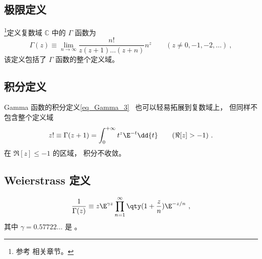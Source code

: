 

\subsection{极限定义}
\footnote{参考 \cite{Arfken} 相关章节。}定义复数域 $\mathbb C$ 中的 $\Gamma$ 函数为
\begin{equation}
\Gamma(z) \equiv \lim_{n\to\infty} \frac{n!}{z(z+1)\dots(z+n)}n^z \qquad (z \ne 0, -1, -2,\dots)~,
\end{equation}
该定义包括了 $\Gamma$ 函数的整个定义域。

\subsection{积分定义}
Gamma 函数的积分定义\autoref{eq_Gamma_3}~ 也可以轻易拓展到复数域上， 但同样不包含整个定义域
\begin{equation}
z! \equiv \Gamma (z + 1) = \int_0^{+\infty} t^z \E^{-t} \dd{t} \qquad (\Re[z] > -1)~.
\end{equation}
在 $\Re[z] \leqslant -1$ 的区域， 积分不收敛。

\subsection{Weierstrass 定义}
\begin{equation}
\frac{1}{\Gamma(z)} \equiv z \E^{\gamma z} \prod_{n=1}^\infty \qty(1 + \frac{z}{n}) \E^{-z/n}~,
\end{equation}
其中 $\gamma = 0.57722\dots$ 是 。

